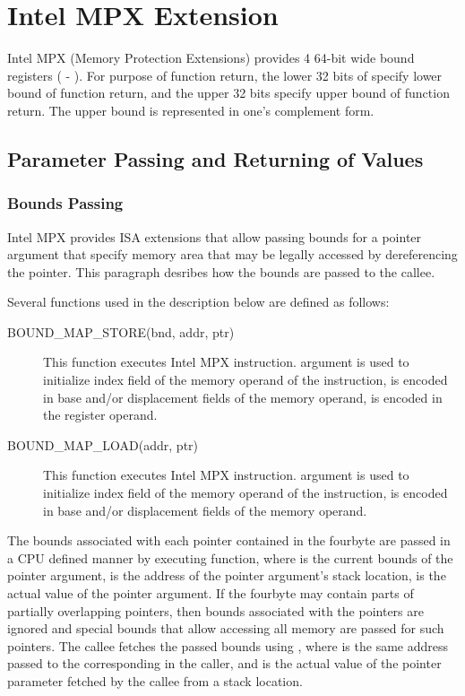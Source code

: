 \chapter{Intel MPX Extension}

Intel MPX (Memory Protection Extensions) provides 4 64-bit wide bound
registers ( - ).  For purpose of function return,
the lower 32 bits of  specify lower bound of function return,
and the upper 32 bits specify upper bound of function return.  The upper
bound is represented in one's complement form.

\section{Parameter Passing and Returning of Values}
\label{mpx-calling-conventions}

\subsection{Bounds Passing}
\label{bounds_passing}
Intel MPX provides ISA extensions that allow passing bounds for a pointer
argument that specify memory area that may be legally accessed by
dereferencing the pointer.  This paragraph desribes how the bounds are
passed to the callee.

Several functions used in the description below are defined as follows:
\begin{description}
\item[BOUND_MAP_STORE(bnd, addr, ptr)] This function executes Intel MPX 
  instruction.   argument is used to initialize index field of the memory
  operand of the  instruction,  is encoded in base and/or
  displacement fields of the memory operand,  is encoded in the register
  operand.
\item[BOUND_MAP_LOAD(addr, ptr)] This function executes Intel MPX 
  instruction.  argument is used to initialize index field of the memory
  operand of the  instruction,  is encoded in base and/or
  displacement fields of the memory operand.
\end{description}

The bounds associated with each pointer contained in the fourbyte are
passed in a CPU defined manner by executing
 function, where  is the
current bounds of the pointer argument,  is the address of the
pointer argument's stack location,  is the actual value of the
pointer argument.  If the fourbyte may contain parts of partially
overlapping pointers, then bounds associated with the pointers are ignored
and special bounds that allow accessing all memory are passed for such
pointers.  The callee fetches the passed bounds using
, where  is the same address
passed to the corresponding  in the caller, and
 is the actual value of the pointer parameter fetched by the
callee from a stack location.


